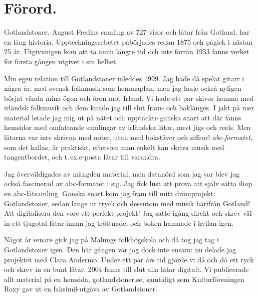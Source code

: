 \fancyhfoffset[E,O]{0pt}
\addtolength{\skip\footins}{\baselineskip}
{
\setlength{\parindent}{1.5em}



\section*{\centering \LARGE Förord.}\vspace{1cm}


Gotlandstoner, August Fredins samling av 727 visor och låtar från Gotland,
har en lång historia. Uppteckningsarbetet påbörjades redan 1875 och pågick
i nästan 25 år. Utgivningen kom att ta ännu längre tid och inte förrän 1933  %
fanns verket för första gången utgivet i sin helhet.

Min egen relation till Gotlandstoner inleddes 1999. Jag hade då spelat gitarr i
några år, med svensk folkmusik som \guillemotright{}hemmaplan\guillemotright{}, men jag hade också nyligen börjat
vända mina ögon och öron mot Irland. Vi hade ett par skivor hemma med irländsk
folkmusik och dem kunde jag till slut fram- och baklänges. I jakt på mer material letade jag
mig ut på nätet och upptäckte ganska snart att där fanns hemsidor med omfattande samlingar
av irländska låtar, mest jigs och reels. Men låtarna var inte skrivna med noter, utan
med bokstäver och siffror! \textit{abc-formatet}, som det kallas, är praktiskt, eftersom man
enkelt kan skriva musik med tangentbordet, och t.\,ex.\@ e-posta låtar till varandra.

Jag överväldigades av mängden material, men datanörd som jag var blev jag också
fascinerad av abc-formatet i sig. Jag fick lust att prova att själv sätta
ihop en abc-låtsamling. Ganska snart kom jag fram till mitt drömprojekt:
Gotlandstoner, sedan länge ur tryck och dessutom med musik härifrån Gotland!
Att digitalisera den vore ett perfekt projekt! Jag satte igång direkt och skrev väl
in ett tjugotal låtar innan jag tröttnade, och boken hamnade i hyllan igen.

Något år senare gick jag på Malungs folkhögskola och då tog jag tag i Gotlandstoner igen.
Den här gången var jag dock inte ensam: nu delade jag projektet med Clara Andermo.
Under ett par års tid gjorde vi då och då ett ryck och skrev in en bunt låtar. 2004
fanns till slut alla låtar digitalt. Vi publicerade allt material på en hemsida, gotlandstoner.se,
samtidigt som Kulturföreningen Roxy gav ut en faksimil-utgåva av Gotlandstoner.

}
